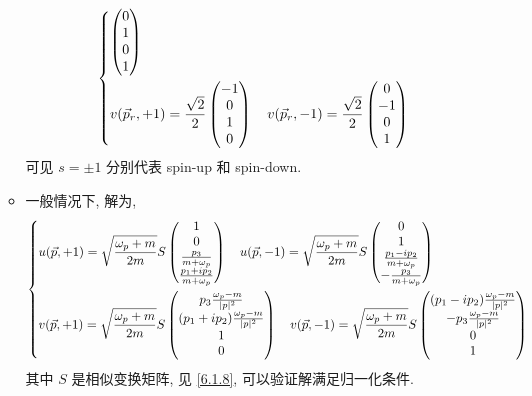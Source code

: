 \begin{itemize}
\begin{itemize}
\begin{equation}
\begin{dcases}
\begin{pmatrix}
					0 \\
					1 \\
					0 \\
					1
				\end{pmatrix} \\
				v(\vec{p}_r, + 1) = \frac{\sqrt{2}}{2} \begin{pmatrix}
					- 1 \\
					0 \\
					1 \\
					0
				\end{pmatrix} \quad v(\vec{p}_r, - 1) = \frac{\sqrt{2}}{2} \begin{pmatrix}
					0 \\
					- 1 \\
					0 \\
					1
				\end{pmatrix}
			\end{dcases}
		\end{equation}
		可见 $s = \pm 1$ 分别代表 spin-up 和 spin-down.
		
		\item 一般情况下, 解为,
		\begin{equation}
			\begin{dcases}
				u(\vec{p}, + 1) = \sqrt{\frac{\omega_p + m}{2 m}} S \begin{pmatrix}
					1 \\
					0 \\
					\frac{p_3}{m + \omega_p} \\
					\frac{p_1 + i p_2}{m + \omega_p}
				\end{pmatrix} \quad u(\vec{p}, - 1) = \sqrt{\frac{\omega_p + m}{2 m}} S \begin{pmatrix}
					0 \\
					1 \\
					\frac{p_1 - i p_2}{m + \omega_p} \\
					- \frac{p_3}{m + \omega_p}
				\end{pmatrix} \\
				v(\vec{p}, + 1) = \sqrt{\frac{\omega_p + m}{2 m}} S \begin{pmatrix}
					p_3 \frac{\omega_p - m}{|p|^2} \\
					(p_1 + i p_2) \frac{\omega_p - m}{|p|^2} \\
					1 \\
					0
				\end{pmatrix} \quad v(\vec{p}, - 1) = \sqrt{\frac{\omega_p + m}{2 m}} S \begin{pmatrix}
					(p_1 - i p_2) \frac{\omega_p - m}{|p|^2} \\
					- p_3 \frac{\omega_p - m}{|p|^2} \\
					0 \\
					1
				\end{pmatrix}
			\end{dcases}
		\end{equation}
		其中 $S$ 是相似变换矩阵, 见 \eqref{6.1.8}, 可以验证解满足归一化条件.
		

\end{itemize}
\end{itemize}
